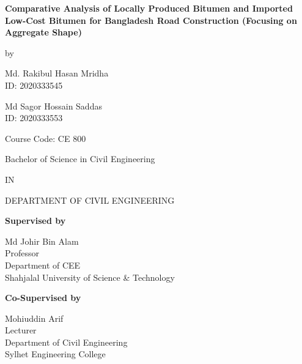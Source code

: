 \documentclass[12pt,a4paper]{article}
\begin{document}
\begin{titlepage}
\centering

\vspace*{0.5cm}

{\large \textbf{Comparative Analysis of Locally Produced Bitumen and Imported Low-Cost Bitumen for Bangladesh Road Construction (Focusing on Aggregate Shape)}\par}

\vspace{0.5cm}

by

\vspace{0.5cm}

Md. Rakibul Hasan Mridha\\
ID: 2020333545

\vspace{0.2cm}

Md Sagor Hossain Saddas\\
ID: 2020333553

\vspace{0.5cm}

Course Code: CE 800

\vspace{0.5cm}

Bachelor of Science in Civil Engineering

\vspace{0.2cm}

IN

\vspace{0.2cm}

DEPARTMENT OF CIVIL ENGINEERING

\vspace{0.5cm}

\textbf{Supervised by}

\vspace{0.1cm}

Md Johir Bin Alam\\
Professor\\
Department of CEE\\
Shahjalal University of Science \& Technology

\vspace{0.4cm}

\textbf{Co-Supervised by}

\vspace{0.1cm}

Mohiuddin Arif\\
Lecturer\\
Department of Civil Engineering\\
Sylhet Engineering College


\end{titlepage}
\end{document}
